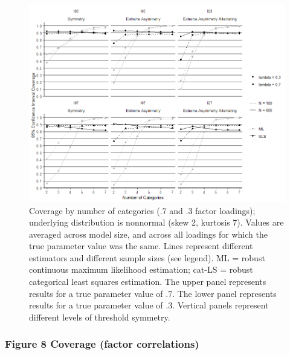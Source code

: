 \documentclass[10,a4paperpaper,]{article}
\begin{document}
\begin{figure}
\includegraphics[width=445pt]{./figures/fig7} \caption{Coverage by number of categories (.7 and .3 factor loadings); underlying distribution is nonnormal (skew 2, kurtosis 7). Values are averaged across model size, and across all loadings for which the true parameter value was the same. Lines represent different estimators and different sample sizes (see legend). ML = robust continuous maximum likelihood estimation; cat-LS = robust categorical least squares estimation. The upper panel represents results for a true parameter value of .7. The lower panel represents results for a true parameter value of .3. Vertical panels represent different levels of threshold symmetry.}\label{fig:unnamed-chunk-6}
\end{figure}

\subsubsection{Figure 8 Coverage (factor correlations)}
\end{document}
